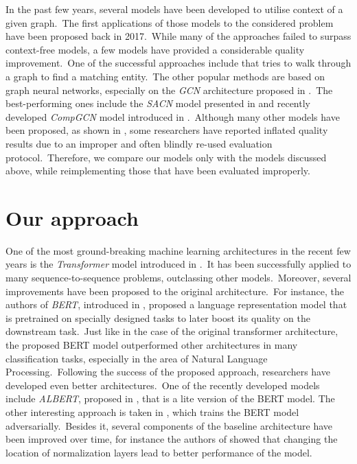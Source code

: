 \documentclass[longabstract, english, mgr]{iithesis}
\theoremstyle{default_theorem_style}\newtheorem{theorem}{Theorem}
\theoremstyle{default_theorem_style}\newtheorem{definition}{Definition}
\begin{document}
\noindent In the past few years, several models have been developed to utilise context of a given graph.\ The first
applications of those models to the considered problem have been proposed back in 2017.\ While many of the
approaches failed to surpass context-free models, a few models have provided a considerable quality
improvement.\ One of the successful approaches include \cite{go_for_a_walk_model} that tries to walk through a graph
to find a matching entity.\ The other popular methods are based on graph neural
networks, especially on the \textit{GCN} architecture proposed in \cite{gcn_model}.\ The best-performing ones
include the \textit{SACN} model presented in \cite{sacn_model} and recently developed \textit{CompGCN} model
introduced in \cite{comp_gcn_model}.\ Although many other models have been proposed, as shown in
\cite{re_evaluation}, some researchers have reported inflated quality results due to an improper and often blindly
re-used evaluation protocol.\ Therefore, we compare our models only with the models discussed above, while
reimplementing those that have been evaluated improperly.

\section{Our approach}

One of the most ground-breaking machine learning architectures in the recent few years is the \textit{Transformer} model
introduced in \cite{transformer_model}.\ It has been successfully applied to many sequence-to-sequence problems,
outclassing other models.\ Moreover, several improvements have been proposed to the original architecture.\ For
instance, the authors of \textit{BERT}, introduced in \cite{bert_model}, proposed a language
representation model that is pretrained on specially designed tasks to later boost its quality on the downstream
task.\ Just like in the case of the original transformer architecture, the proposed BERT model outperformed other
architectures in many classification tasks, especially in the area of Natural Language Processing.\ Following the
success of the proposed approach, researchers have developed even better architectures.\ One of the recently
developed models include \textit{ALBERT}, proposed in \cite{albert_model}, that is a lite version of the BERT model.
The other interesting approach is taken in \cite{electra_model}, which trains the BERT model adversarially.\ Besides it,
several components of the baseline architecture have been improved over time, for instance the authors of
\cite{layer_normalization_in_transformers} showed that changing the location of normalization layers lead to better
performance of the model.\newline
\end{document}
